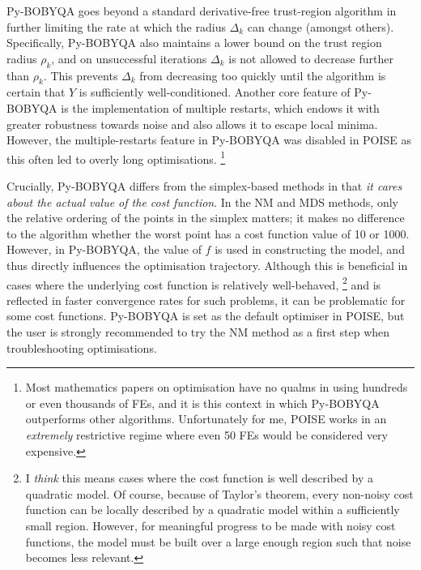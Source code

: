 Py-BOBYQA goes beyond a standard derivative-free trust-region algorithm in further limiting the rate at which the radius $\Delta_k$ can change (amongst others).
Specifically, Py-BOBYQA also maintains a lower bound on the trust region radius $\rho_k$, and on unsuccessful iterations $\Delta_k$ is not allowed to decrease further than $\rho_k$.
This prevents $\Delta_k$ from decreasing too quickly until the algorithm is certain that $Y$ is sufficiently well-conditioned.\autocite{Powell2003MP}
Another core feature of Py-BOBYQA is the implementation of multiple restarts, which endows it with greater robustness towards noise and also allows it to escape local minima.\autocite{Cartis2019ACMTMS,Cartis2022O}
However, the multiple-restarts feature in Py-BOBYQA was disabled in POISE as this often led to overly long optimisations.%
\footnote{Most mathematics papers on optimisation have no qualms in using hundreds or even thousands of FEs, and it is this context in which Py-BOBYQA outperforms other algorithms. Unfortunately for me, POISE works in an \textit{extremely} restrictive regime where even 50 FEs would be considered very expensive.}

Crucially, Py-BOBYQA differs from the simplex-based methods in that \textit{it cares about the actual value of the cost function}.
In the NM and MDS methods, only the relative ordering of the points in the simplex matters; it makes no difference to the algorithm whether the worst point has a cost function value of 10 or 1000.
However, in Py-BOBYQA, the value of $f$ is used in constructing the model, and thus directly influences the optimisation trajectory.
Although this is beneficial in cases where the underlying cost function is relatively well-behaved,%
\footnote{I \textit{think} this means cases where the cost function is well described by a quadratic model. Of course, because of Taylor's theorem, every non-noisy cost function can be locally described by a quadratic model within a sufficiently small region. However, for meaningful progress to be made with noisy cost functions, the model must be built over a large enough region such that noise becomes less relevant.}
and is reflected in faster convergence rates for such problems, it can be problematic for some cost functions.
Py-BOBYQA is set as the default optimiser in POISE, but the user is strongly recommended to try the NM method as a first step when troubleshooting optimisations.
